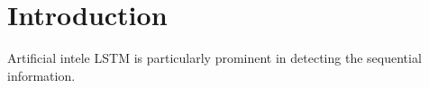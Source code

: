 \section{Introduction}
Artificial intele
LSTM is particularly prominent in detecting the sequential information. 